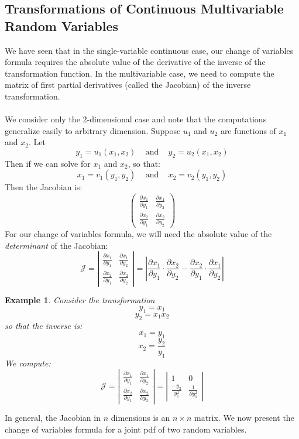 \documentclass[12pt]{article} %
\newtheorem{example}{Example}
\begin{document}
\subsection{Transformations of Continuous Multivariable Random Variables}
We have seen that in the single-variable continuous case, our change of variables formula requires the absolute value of the derivative of the inverse of the transformation function. In the multivariable case, we need to compute the matrix of first partial derivatives (called the Jacobian) of the inverse transformation.\\\\
We consider only the 2-dimensional case and note that the computations generalize easily to arbitrary dimension. Suppose $u_1$ and $u_2$ are functions of $x_1$ and $x_2$. Let 
$$y_1 = u_1(x_1,x_2) \;\;\;\textrm{ and }\;\;\; y_2 = u_2(x_1,x_2)$$
Then if we can solve for $x_1$ and $x_2$, so that:
$$x_1 = v_1(y_1,y_2)  \;\;\;\textrm{ and }\;\;\; x_2 = v_2(y_1,y_2)$$
Then the Jacobian is:
$$\left(\begin{matrix}
\frac{\partial x_1}{\partial y_1} &\frac{\partial x_1}{\partial y_2} \\
\frac{\partial x_2}{\partial y_1} &\frac{\partial x_2}{\partial y_2} 
\end{matrix}\right)$$
For our change of variables formula, we will need the absolute value of the \emph{determinant} of the Jacobian:
$$\mathcal{J} = \left|\begin{matrix}
\frac{\partial x_1}{\partial y_1} &\frac{\partial x_1}{\partial y_2} \\
\frac{\partial x_2}{\partial y_1} &\frac{\partial x_2}{\partial y_2} 
\end{matrix}\right| = \left|\frac{\partial x_1}{\partial y_1}\cdot\frac{\partial x_2}{\partial y_2} -  \frac{\partial x_2}{\partial y_1}\cdot \frac{\partial x_1}{\partial y_2}\right|$$
\begin{example}
Consider the transformation 
$$y_1 = x_1$$
$$y_2 = x_1x_2$$
so that the inverse is:
$$x_1 = y_1$$
$$x_2=\frac{y_2}{y_1}$$
We compute:
$$\mathcal{J} = \left|\begin{matrix}
\frac{\partial x_1}{\partial y_1} &\frac{\partial x_1}{\partial y_2} \\
\frac{\partial x_2}{\partial y_1} &\frac{\partial x_2}{\partial y_2} 
\end{matrix}\right| = \left|\begin{matrix}
1 & 0 \\
\frac{-y_2}{y_1^2} &\frac{1}{\partial y_1^2} 
\end{matrix}\right|$$
\end{example}
In general, the Jacobian in $n$ dimensions is an $n\times n$ matrix. We now present the change of variables formula for a joint pdf of two random variables.\\
\end{document}

